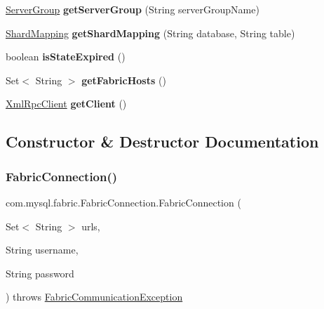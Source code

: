 \begin{DoxyCompactItemize}
\mbox{\hyperlink{classcom_1_1mysql_1_1fabric_1_1_server_group}{Server\+Group}} {\bfseries get\+Server\+Group} (String server\+Group\+Name)
\item 
\mbox{\label{classcom_1_1mysql_1_1fabric_1_1_fabric_connection_a967e99d19059cbb528f735d1d3a79bbc}} 
\mbox{\hyperlink{classcom_1_1mysql_1_1fabric_1_1_shard_mapping}{Shard\+Mapping}} {\bfseries get\+Shard\+Mapping} (String database, String table)
\item 
\mbox{\label{classcom_1_1mysql_1_1fabric_1_1_fabric_connection_accdcdbe0488949e8378e565de365da23}} 
boolean {\bfseries is\+State\+Expired} ()
\item 
\mbox{\label{classcom_1_1mysql_1_1fabric_1_1_fabric_connection_ac496bdea8dc324f8769b7be75a827f58}} 
Set$<$ String $>$ {\bfseries get\+Fabric\+Hosts} ()
\item 
\mbox{\label{classcom_1_1mysql_1_1fabric_1_1_fabric_connection_a64bb580f34d81ad8e4b30599031127fc}} 
\mbox{\hyperlink{classcom_1_1mysql_1_1fabric_1_1proto_1_1xmlrpc_1_1_xml_rpc_client}{Xml\+Rpc\+Client}} {\bfseries get\+Client} ()
\end{DoxyCompactItemize}


\subsection{Constructor \& Destructor Documentation}
\mbox{\label{classcom_1_1mysql_1_1fabric_1_1_fabric_connection_a8d7d3ea0363c352f69ef2b4c6f311637}} 
\subsubsection{\texorpdfstring{Fabric\+Connection()}{FabricConnection()}}
{\footnotesize\ttfamily com.\+mysql.\+fabric.\+Fabric\+Connection.\+Fabric\+Connection (\begin{DoxyParamCaption}\item[{Set$<$ String $>$}]{urls,  }\item[{String}]{username,  }\item[{String}]{password }\end{DoxyParamCaption}) throws \mbox{\hyperlink{classcom_1_1mysql_1_1fabric_1_1_fabric_communication_exception}{Fabric\+Communication\+Exception}}}



